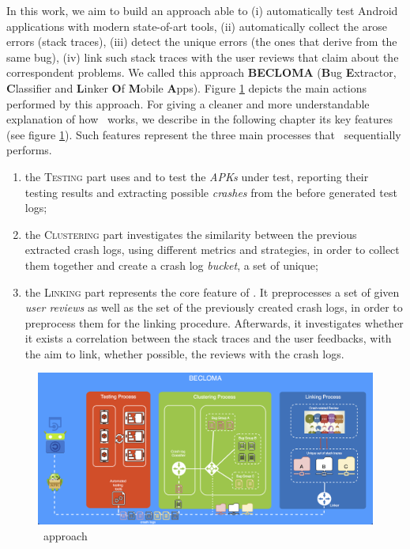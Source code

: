 \label{chapter:approach}
In this work, we aim to build an approach able to (i) automatically test Android applications with modern state-of-art tools, (ii) automatically collect the arose errors (\ie stack traces), (iii) detect the unique errors (\ie the ones that derive from the same bug), (iv) link such stack traces with the user reviews that claim about the correspondent problems.           
We called this approach \textbf{BECLOMA} (\textbf{B}ug \textbf{E}xtractor, \textbf{C}lassifier and \textbf{L}inker \textbf{O}f \textbf{M}obile \textbf{A}pps).
Figure \ref{fig: becloma} depicts the main actions performed by this approach.
For giving a cleaner and more understandable explanation of how \toolname\ works, we describe in the following chapter its key features (see figure \ref{fig: becloma}). Such features represent the three main processes that \toolname\ sequentially performs.
\begin{enumerate}
\item the \textsc{Testing} part uses \monkey and \sapienz to test the \textit{APKs} under test, reporting their testing results and extracting possible \textit{crashes} from the before generated test logs; 

\item the \textsc{Clustering} part investigates the similarity between the previous extracted crash logs, using different metrics and strategies, in order to collect them together and create a crash log \textit{bucket}, \ie a set of unique; 

\item the \textsc{Linking} part represents the core feature of \toolname. It preprocesses a set of given \textit{user reviews} as well as the set of the previously created crash logs, in order to preprocess them for the linking procedure. Afterwards, it investigates whether it exists a correlation between the stack traces and the user feedbacks, with the aim to link, whether possible, the reviews with the crash logs. 
\end{enumerate}
\begin{figure}[tb]
\centering 
\includegraphics[width=\columnwidth]{diagrams/becloma_approach_img} 
\caption{\toolname\ approach}
\label{fig: becloma}
\end{figure}


